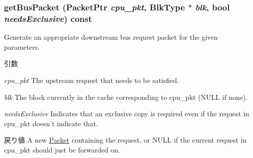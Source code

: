\hypertarget{classCache_a3bdcf30020fcb7b18e1d1f95cc86648e}{
\subsubsection[{getBusPacket}]{ getBusPacket ({\bf PacketPtr} {\em cpu\_\-pkt}, \/  {\bf BlkType} $\ast$ {\em blk}, \/  bool {\em needsExclusive}) const}}
\label{classCache_a3bdcf30020fcb7b18e1d1f95cc86648e}
Generate an appropriate downstream bus request packet for the given parameters. 
\begin{DoxyParams}{引数}
\item[{\em cpu\_\-pkt}]The upstream request that needs to be satisfied. \item[{\em blk}]The block currently in the cache corresponding to cpu\_\-pkt (NULL if none). \item[{\em needsExclusive}]Indicates that an exclusive copy is required even if the request in cpu\_\-pkt doesn't indicate that. \end{DoxyParams}
\begin{DoxyReturn}{戻り値}
A new \hyperlink{classPacket}{Packet} containing the request, or NULL if the current request in cpu\_\-pkt should just be forwarded on. 
\end{DoxyReturn}




